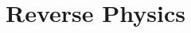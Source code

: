\documentclass[11pt,letterpaper,fleqn]{memoir}
\begin{document}
\part*{Reverse Physics}

\tableofcontents* 

\cleardoublepage 
\mainmatter

\begingroup
\pagestyle{plain}



\newpage
\endgroup



	
\end{document}
